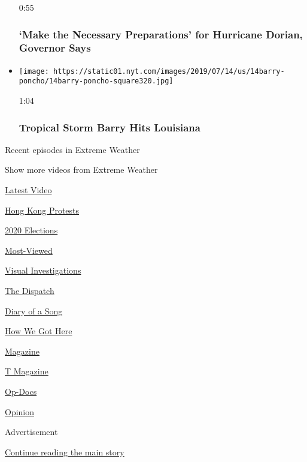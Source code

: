 \begin{itemize}
  0:55

  \hypertarget{make-the-necessary-preparations-for-hurricane-dorian-governor-says}{%
  \subsubsection{`Make the Necessary Preparations' for Hurricane Dorian,
  Governor
  Says}\label{make-the-necessary-preparations-for-hurricane-dorian-governor-says}}
\item
  \href{https://www.nytimes.com/video/us/100000006610272/hurricane-barry-video.html?action=click\&module=video-series-bar\&region=header\&pgtype=Article\&playlistId=video/extreme-weather}{}

  \texttt{[image: https://static01.nyt.com/images/2019/07/14/us/14barry-poncho/14barry-poncho-square320.jpg]}

  1:04

  \hypertarget{tropical-storm-barry-hits-louisiana}{%
  \subsubsection{Tropical Storm Barry Hits
  Louisiana}\label{tropical-storm-barry-hits-louisiana}}
\end{itemize}

Recent episodes in Extreme Weather

Show more videos from Extreme Weather

\href{/video}{}

\href{/video/latest-video}{Latest Video}

\href{/video/hk-protest}{Hong Kong Protests}

\href{/video/2020-Elections}{2020 Elections}

\href{/video/Most-Viewed}{Most-Viewed}

\href{/video/investigations}{Visual Investigations}

\href{/video/on-the-ground}{The Dispatch}

\href{/video/diaryofasong}{Diary of a Song}

\href{/video/how-we-got-here}{How We Got Here}

\href{/video/magazine}{Magazine}

\href{/video/t-magazine}{T Magazine}

\href{/video/op-docs}{Op-Docs}

\href{/video/opinion}{Opinion}

Advertisement

\protect\hyperlink{after-bottom}{Continue reading the main story}

